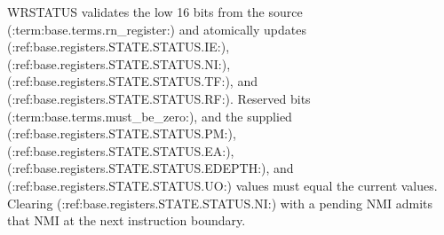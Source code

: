 WRSTATUS validates the low 16 bits from the source (:term:base.terms.rn_register:) and atomically updates (:ref:base.registers.STATE.STATUS.IE:), (:ref:base.registers.STATE.STATUS.NI:), (:ref:base.registers.STATE.STATUS.TF:), and (:ref:base.registers.STATE.STATUS.RF:). Reserved bits (:term:base.terms.must_be_zero:), and the supplied (:ref:base.registers.STATE.STATUS.PM:), (:ref:base.registers.STATE.STATUS.EA:), (:ref:base.registers.STATE.STATUS.EDEPTH:), and (:ref:base.registers.STATE.STATUS.UO:) values must equal the current values. Clearing (:ref:base.registers.STATE.STATUS.NI:) with a pending NMI admits that NMI at the next instruction boundary.
